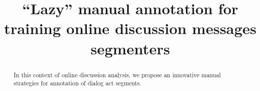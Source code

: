 \documentclass[11pt]{article}
\title{``Lazy'' manual annotation for training online discussion messages segmenters} %
\date{}
\author{}
\begin{document}
\maketitle

\begin{abstract}
In this context of online discussion analysis, we propose an innovative manual strategies for annotation of dialog act segments.
\end{abstract}



%
% 
\blfootnote{
    \hspace{-0.65cm}  %
}















\end{document}
